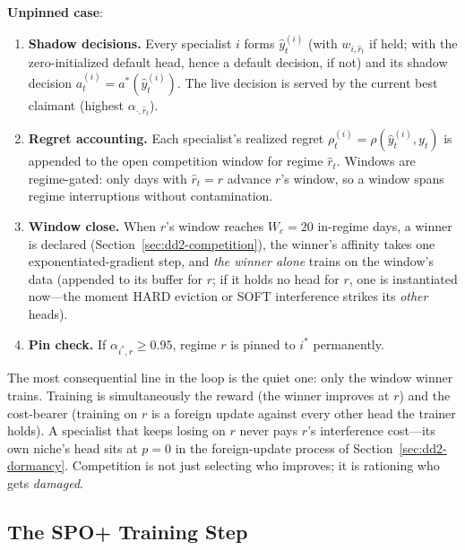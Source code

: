 \documentclass[11pt,a4paper]{article}
\theoremstyle{definition}
\theoremstyle{plain}
\begin{document}
\textbf{Unpinned case}:
\begin{enumerate}
  \item \textbf{Shadow decisions.} Every specialist $i$ forms
        $\hat y^{(i)}_t$ (with $w_{i, \hat r_t}$ if held; with the
        zero-initialized default head, hence a default decision, if not) and
        its shadow decision $a^{(i)}_t = a^{*}(\hat y^{(i)}_t)$. The live
        decision is served by the current best claimant (highest
        $\alpha_{\cdot, \hat r_t}$).
  \item \textbf{Regret accounting.} Each specialist's realized regret
        $\rho^{(i)}_t = \rho(\hat y^{(i)}_t, y_t)$ is appended to the open
        competition window for regime $\hat r_t$. Windows are regime-gated:
        only days with $\hat r_t = r$ advance $r$'s window, so a window
        spans regime interruptions without contamination.
  \item \textbf{Window close.} When $r$'s window reaches $W_c = 20$
        in-regime days, a winner is declared
        (Section~\ref{sec:dd2-competition}), the winner's affinity takes one
        exponentiated-gradient step, and \emph{the winner alone} trains on
        the window's data (appended to its buffer for $r$; if it holds no
        head for $r$, one is instantiated now---the moment HARD eviction or
        SOFT interference strikes its \emph{other} heads).
  \item \textbf{Pin check.} If $\alpha_{i^{*}, r} \ge 0.95$, regime $r$ is
        pinned to $i^{*}$ permanently.
\end{enumerate}

\begin{intuition}[title={Why losers do not train}]
The most consequential line in the loop is the quiet one: only the window
winner trains. Training is simultaneously the reward (the winner improves at
$r$) and the cost-bearer (training on $r$ is a foreign update against every
other head the trainer holds). A specialist that keeps losing on $r$ never
pays $r$'s interference cost---its own niche's head sits at $p = 0$ in the
foreign-update process of Section~\ref{sec:dd2-dormancy}. Competition is not
just selecting who improves; it is rationing who gets \emph{damaged}.
\end{intuition}

\subsection{The SPO+ Training Step}
\label{sec:dd2-training}
\end{document}
